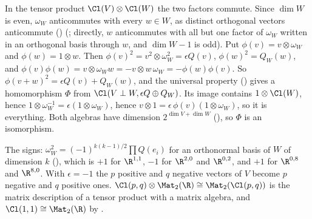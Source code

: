 In the tensor product $\Cl(V) \otimes \Cl(W)$ the two factors commute. Since $\dim W$ is even, $\omega_W$ anticommutes with every $w \in W$, as distinct orthogonal vectors anticommute () (; directly, $w$ anticommutes with all but one factor of $\omega_W$ written in an orthogonal basis through $w$, and $\dim W - 1$ is odd). Put $\phi(v) = v \otimes \omega_W$ and $\phi(w) = 1 \otimes w$. Then $\phi(v)^{2} = v^{2} \otimes \omega_W^{2} = \epsilon Q(v)$, $\phi(w)^{2} = Q_W(w)$, and $\phi(v)\phi(w) = v \otimes \omega_W w = -v \otimes w\,\omega_W = -\phi(w)\phi(v)$. So $\phi(v + w)^{2} = \epsilon Q(v) + Q_W(w)$, and the universal property () gives a homomorphism $\Phi$ from $\Cl(V \perp W, \epsilon Q \oplus Q_W)$. Its image contains $1 \otimes \Cl(W)$, hence $1 \otimes \omega_W^{-1} = \epsilon (1 \otimes \omega_W)$, hence $v \otimes 1 = \epsilon\,\phi(v)(1 \otimes \omega_W)$, so it is everything. Both algebras have dimension $2^{\dim V + \dim W}$ (), so $\Phi$ is an isomorphism.

The signs: $\omega_W^{2} = (-1)^{k(k-1)/2} \prod Q(e_i)$ for an orthonormal basis of $W$ of dimension $k$ (), which is $+1$ for $\R^{1,1}$, $-1$ for $\R^{2,0}$ and $\R^{0,2}$, and $+1$ for $\R^{0,8}$ and $\R^{8,0}$. With $\epsilon = -1$ the $p$ positive and $q$ negative vectors of $V$ become $p$ negative and $q$ positive ones. $\Cl(p,q) \otimes \Mat_2(\R) \cong \Mat_2(\Cl(p,q))$ is the matrix description of a tensor product with a matrix algebra, and $\Cl(1,1) \cong \Mat_2(\R)$ by .
